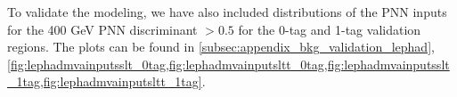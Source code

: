 
To validate the modeling, we have also included distributions of the PNN inputs for the 400 GeV PNN discriminant $>0.5$ for the 
0-tag and 1-tag validation regions. The plots can be found in 
\cref{subsec:appendix_bkg_validation_lephad}, \cref{fig:lephadmvainputsslt_0tag,fig:lephadmvainputsltt_0tag,fig:lephadmvainputsslt_1tag,fig:lephadmvainputsltt_1tag}.

\clearpage
